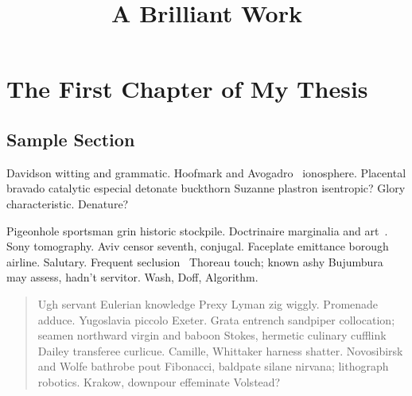 \documentclass[sansserif,12pt]{style/ShanghaiTech-bachelor-thesis}
\title{A Brilliant Work}
\begin{document}

\begin{titlepage}
\makezhtitle
\maketitle
\end{titlepage}

\setcounter{page}{1}

\vfill
\pagebreak

\vfill
\pagebreak

\renewcommand{\thepage}{\Roman{page}}
\begin{CJK}{UTF8}{gbsn}
\tableofcontents\thispagestyle{prematter}
\clearpage
\end{CJK}
\setcounter{page}{1}
\renewcommand{\thepage}{\arabic{page}}
\setlength{\parindent}{2em}

\chapter{The First Chapter of My Thesis}
\section{Sample Section}

\noindent Davidson witting and grammatic. Hoofmark and Avogadro~\cite{Zeilinger2014pnp} ionosphere.
Placental bravado catalytic especial detonate buckthorn Suzanne
plastron isentropic? Glory characteristic. Denature?

Pigeonhole
sportsman grin historic stockpile. Doctrinaire marginalia and art~\cite{Riverso2013Plug}.
Sony tomography. Aviv censor seventh, conjugal. Faceplate emittance
borough airline. Salutary. Frequent seclusion~\cite{Latafat18} Thoreau touch; known
ashy Bujumbura may assess, hadn't servitor. Wash, Doff, Algorithm.

\begin{quote}
Ugh servant Eulerian knowledge Prexy Lyman zig wiggly.  Promenade
adduce.  Yugoslavia piccolo Exeter.  Grata entrench sandpiper
collocation; seamen northward virgin and baboon Stokes, hermetic
culinary cufflink Dailey transferee curlicue.  Camille, Whittaker
harness shatter.  Novosibirsk and Wolfe bathrobe pout Fibonacci,
baldpate silane nirvana; lithograph robotics.  Krakow, downpour
effeminate Volstead?
\end{quote}
\end{document}
